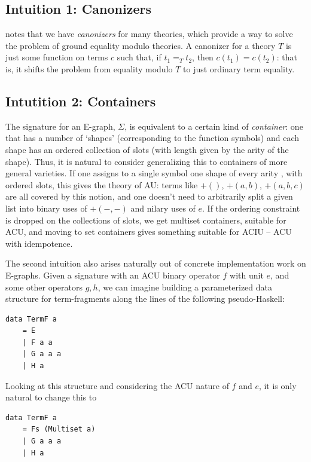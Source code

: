 \documentclass[12pt,a4paper,twoside,openright]{report}
\numberwithin{equation}{chapter}		%
\numberwithin{figure}{chapter}			%
\numberwithin{table}{chapter}			%
\theoremstyle{definition}
\theoremstyle{plain}
\begin{document}
\subsection{Intuition 1: Canonizers}
\citet{zucker_omelets_2025} notes that we have \emph{canonizers} for many theories, which provide a way to solve the problem of ground equality modulo theories. A canonizer for a theory $T$ is just some function on terms $c$ such that, if $t_1 =_T t_2$, then $c(t_1) = c(t_2)$: that is, it shifts the problem from equality modulo $T$ to just ordinary term equality.

\subsection{Intutition 2: Containers}
The signature for an E-graph, $\Sigma$, is equivalent to a certain kind of \emph{container}: one that has a number of `shapes' (corresponding to the function symbols) and each shape has an ordered collection of slots (with length given by the arity of the shape). Thus, it is natural to consider generalizing this to containers of more general varieties. If one assigns to a single symbol one shape of every arity , with ordered slots, this gives the theory of AU: terms like $+()$, $+(a, b)$, $+(a, b, c)$ are all covered by this notion, and one doesn't need to arbitrarily split a given list into binary uses of $+(-,-)$ and nilary uses of $e$. If the ordering constraint is dropped on the collections of slots, we get multiset containers, suitable for ACU, and moving to set containers gives something suitable for ACIU -- ACU with idempotence.

The second intuition also arises naturally out of concrete implementation work on E-graphs. Given a signature with an ACU binary operator $f$ with unit $e$, and some other operators $g, h$, we can imagine building a parameterized data structure for term-fragments along the lines of the following pseudo-Haskell:

\begin{verbatim}
data TermF a
	= E
	| F a a
	| G a a a
	| H a
\end{verbatim}

Looking at this structure and considering the ACU nature of $f$ and $e$, it is only natural to change this to

\begin{verbatim}
data TermF a
	= Fs (Multiset a)
	| G a a a
	| H a
\end{verbatim}
\end{document}
